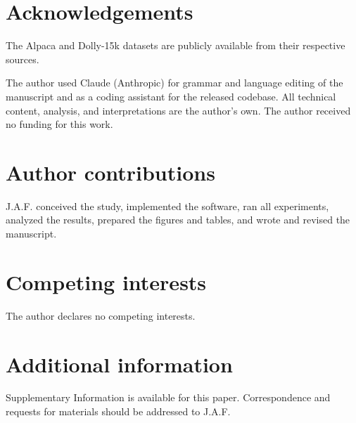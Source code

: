 \documentclass[pdflatex,sn-nature,lineno]{sn-jnl}
\begin{document}
\section*{Acknowledgements}
The Alpaca and Dolly-15k datasets are publicly available from their respective sources.

The author used Claude (Anthropic) for grammar and language editing of the manuscript and as a coding assistant for the released codebase. All technical content, analysis, and interpretations are the author's own. The author received no funding for this work.

\section*{Author contributions}
J.A.F. conceived the study, implemented the software, ran all experiments, analyzed the results, prepared the figures and tables, and wrote and revised the manuscript.

\section*{Competing interests}
The author declares no competing interests.

\section*{Additional information}
Supplementary Information is available for this paper. Correspondence and requests for materials should be addressed to J.A.F.
\end{document}
